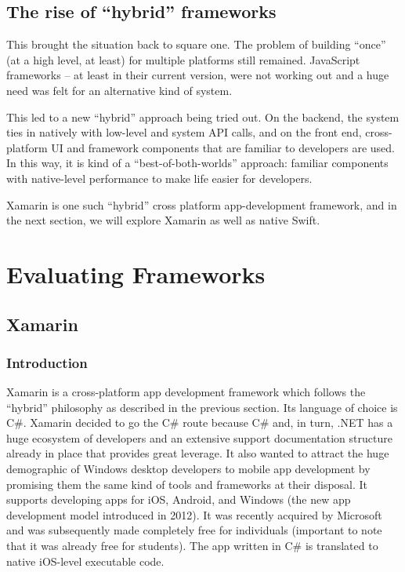 \documentclass[12pt,a4paper]{article}
\begin{document}
	\subsection{The rise of ``hybrid'' frameworks}
	
	This brought the situation back to square one. The problem of building ``once'' (at a high level, at least) for multiple platforms still remained. JavaScript frameworks -- at least in their current version, were not working out and a huge need was felt for an alternative kind of system.
	
	This led to a new ``hybrid'' approach being tried out. On the backend, the system ties in natively with low-level and system API calls, and on the front end, cross-platform UI and framework components that are familiar to developers are used. In this way, it is kind of a ``best-of-both-worlds'' approach: familiar components with native-level performance to make life easier for developers.
	
	Xamarin is one such ``hybrid'' cross platform app-development framework, and in the next section, we will explore Xamarin as well as native Swift.
	
	\section{Evaluating Frameworks}
	
	\subsection{Xamarin}
	
	\subsubsection{Introduction}
	
	Xamarin is a cross-platform app development framework which follows the ``hybrid'' philosophy as described in the previous section. Its language of choice is C\#. Xamarin decided to go the C\# route because C\# and, in turn, .NET has a huge ecosystem of developers and an extensive support documentation structure already in place that provides great leverage. It also wanted to attract the huge demographic of Windows desktop developers to mobile app development by promising them the same kind of tools and frameworks at their disposal. It supports developing apps for iOS, Android, and Windows (the new app development model introduced in 2012). It was recently acquired by Microsoft and was subsequently made completely free for individuals (important to note that it was already free for students). The app written in C\# is translated to native iOS-level executable code.
	
\end{document}
